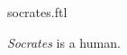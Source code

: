 \documentclass{stex}
\begin{document}
\begin{smodule}{socrates.ftl}


\begin{signature}[forthel]
  \emph{Socrates} is a human.
\end{signature}

\end{smodule}
\end{document}

